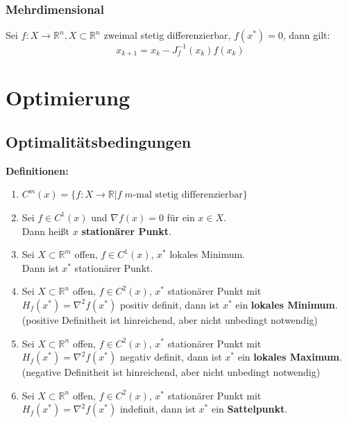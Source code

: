 \documentclass[4pt,a4paper]{scrartcl}
\begin{document}
\begin{multicols}{4}
\subsubsection{Mehrdimensional}
Sei $f:X\rightarrow\mathbb{R}^n,X\subset\mathbb{R}^n$ zweimal stetig differenzierbar, $f(x^*)=0$, dann gilt:
\begin{equation*}
x_{k+1}=x_k-J_f^{-1}(x_k)f(x_k)
\end{equation*}

\section{Optimierung}

\subsection{Optimalitätsbedingungen}
\textbf{Definitionen:}
\begin{enumerate}[label=$\bullet$]
\item $C^m(x)=\{f:X\rightarrow\mathbb{R}|f\;m\text{-mal stetig differenzierbar}\}$
\item Sei $f\in C^1(x)$ und $\nabla f(x)=0$ für ein $x\in X$.\\
Dann heißt $x$ \textbf{stationärer Punkt}.
\item Sei $X\subset\mathbb{R}^m$ offen, $f\in C^1(x)$, $x^*$ lokales Minimum.\\
Dann ist $x^*$ stationärer Punkt.
\item Sei $X\subset\mathbb{R}^n$ offen, $f\in C^2(x)$, $x^*$ stationärer Punkt mit $H_f(x^*)=\nabla^2f(x^*)$ positiv definit, dann ist $x^*$ ein \textbf{lokales Minimum}.\\
(positive Definitheit ist hinreichend, aber nicht unbedingt notwendig)
\item Sei $X\subset\mathbb{R}^n$ offen, $f\in C^2(x)$, $x^*$ stationärer Punkt mit $H_f(x^*)=\nabla^2f(x^*)$ negativ definit, dann ist $x^*$ ein \textbf{lokales Maximum}.\\
(negative Definitheit ist hinreichend, aber nicht unbedingt notwendig)
\item Sei $X\subset\mathbb{R}^n$ offen, $f\in C^2(x)$, $x^*$ stationärer Punkt mit $H_f(x^*)=\nabla^2f(x^*)$ indefinit, dann ist $x^*$ ein \textbf{Sattelpunkt}.\\
\end{enumerate}


\end{multicols}
\end{document}
